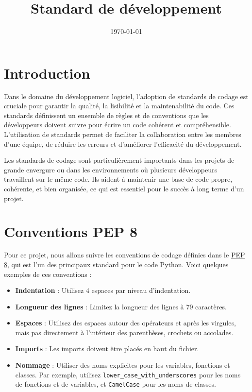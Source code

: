 \documentclass[a4paper,12pt]{article}
\title{Standard de développement}
\author{}
\date{\today}
\begin{document}
\maketitle

\section{Introduction}

Dans le domaine du développement logiciel, l'adoption de standards de codage est cruciale pour garantir la qualité, la lisibilité et la maintenabilité du code. Ces standards définissent un ensemble de règles et de conventions que les développeurs doivent suivre pour écrire un code cohérent et compréhensible. L'utilisation de standards permet de faciliter la collaboration entre les membres d'une équipe, de réduire les erreurs et d'améliorer l'efficacité du développement.

Les standards de codage sont particulièrement importants dans les projets de grande envergure ou dans les environnements où plusieurs développeurs travaillent sur le même code. Ils aident à maintenir une base de code propre, cohérente, et bien organisée, ce qui est essentiel pour le succès à long terme d'un projet.


\section{Conventions PEP 8}

Pour ce projet, nous allons suivre les conventions de codage définies dans le \href{https://peps.python.org/pep-0008/}{PEP 8}, qui est l'un des principaux standard pour le code Python. Voici quelques exemples de ces conventions :

\begin{itemize} 
  \item \textbf{Indentation} : Utilisez 4 espaces par niveau d'indentation.
  \item \textbf{Longueur des lignes} : Limitez la longueur des lignes à 79 caractères.
  \item \textbf{Espaces} : Utilisez des espaces autour des opérateurs et après les virgules, mais pas directement à l'intérieur des parenthèses, crochets ou accolades.
  \item \textbf{Imports} : Les imports doivent être placés en haut du fichier.
  \item \textbf{Nommage} : Utiliser des noms explicites pour les variables, fonctions et classes. Par exemple, utilisez \texttt{lower\_case\_with\_underscores} pour les noms de fonctions et de variables, et \texttt{CamelCase} pour les noms de classes.
\end{itemize}
\end{document}

